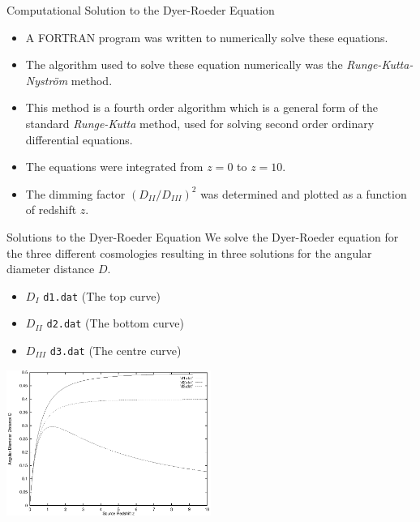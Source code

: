 \documentclass[aspectratio=1610,xcolor=dvipsnames,t]{beamer}
\begin{document}
\begin{frame}{Computational Solution to the Dyer-Roeder Equation} 
\begin{itemize} 
\item A FORTRAN program was written
to numerically solve these equations. 
\item The algorithm used to solve these
equation numerically was the \emph{Runge-Kutta-Nystr\"{o}m}
method.  
\item This method is a fourth order algorithm which is a general form 
of the standard \emph{Runge-Kutta} method, used for solving second order 
ordinary differential equations.
\item The equations were integrated from $z = 0$ to $z = 10$. 
\item The dimming factor $(D_{II}/D_{III})^2$ was determined and plotted
as a function of redshift $z$.
\end{itemize} 
\end{frame} 

\begin{frame}{Solutions to the Dyer-Roeder Equation} 
We solve the Dyer-Roeder
equation for the three different cosmologies resulting in three
solutions for the angular diameter distance $D$.
\begin{itemize}
    \item $D_{I}$   \texttt{d1.dat} (The top curve)
    \item $D_{II}$  \texttt{d2.dat} (The bottom curve)
    \item $D_{III}$ \texttt{d3.dat} (The centre curve)
\end{itemize}
    \begin{center}
        \includegraphics[width=0.5\textwidth]{results/cosmo_all.eps}
    \end{center}
\end{frame}
\end{document}
